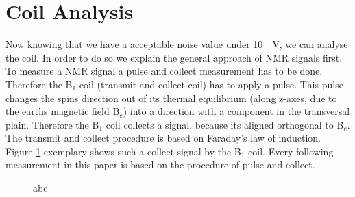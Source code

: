 \section{Coil Analysis}
\label{sec:CoilAnalyssis}
Now knowing that we have a acceptable noise value under \SI{10}{\mu \volt}, we can analyse the coil. In order to do so we explain the general approach of NMR signals first. To measure a NMR signal a pulse and collect measurement has to be done. Therefore the B$_1$ coil (transmit and collect coil) has to apply a pulse. This pulse changes the spins direction out of its thermal equilibrium (along z-axes, due to the earths magnetic field B$_e$) into a direction with a component in the transversal plain. Therefore the B$_1$ coil collects a signal, because its aligned orthogonal to B$_e$. The transmit and collect procedure is based on Faraday's law of induction. Figure \ref{fig: PulsandcollectValesignal} exemplary shows such a collect signal by the B$_1$ coil. Every following measurement in this paper is based on the procedure of pulse and collect.

\begin{figure}[H]
    \centering
    
    \caption[abc]{abc}
    \label{fig: PulsandcollectValesignal}
\end{figure}

